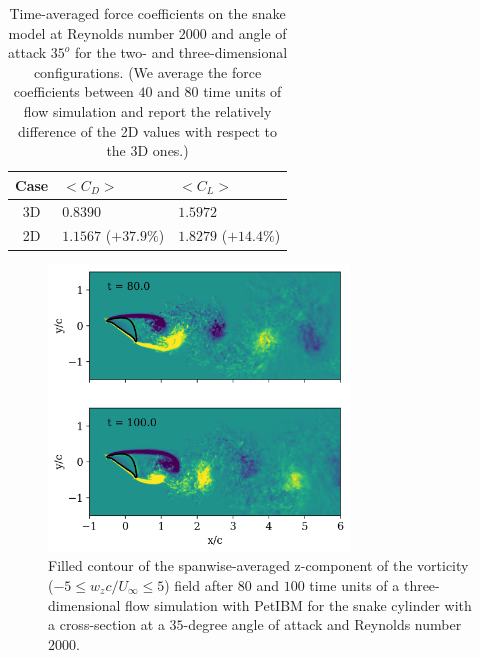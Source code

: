 \documentclass[10pt,journal,compsoc]{IEEEtran}
\begin{document}
\begin{table}[!h]
    \renewcommand{\arraystretch}{1.5}
    \caption{Time-averaged force coefficients on the snake model at Reynolds number $2000$ and angle of attack $35^o$ for the two- and three-dimensional configurations. (We average the force coefficients between $40$ and $80$ time units of flow simulation and report the relatively difference of the 2D values with respect to the 3D ones.)}
    \label{tab:force_coefficients}
    \centering
    \begin{tabular}{cll}
        Case & $<C_D>$ & $<C_L>$ \\
        \hline
        3D & $0.8390$ & $1.5972$ \\
        2D & $1.1567$ ($+37.9\%$) & $1.8279$ ($+14.4\%$) \\
        \hline
    \end{tabular}
\end{table}

\begin{figure}
    \centering
    \includegraphics[width=8cm]{figures/wz_avg_multi_contourf.png}
    \caption{Filled contour of the spanwise-averaged z-component of the vorticity ($-5 \leq w_z c / U_\infty \leq 5$) field after $80$ and $100$ time units of a three-dimensional flow simulation with PetIBM for the snake cylinder with a cross-section at a $35$-degree angle of attack and Reynolds number $2000$.}
    \label{fig:wz_avg_3d}
\end{figure}
\end{document}
